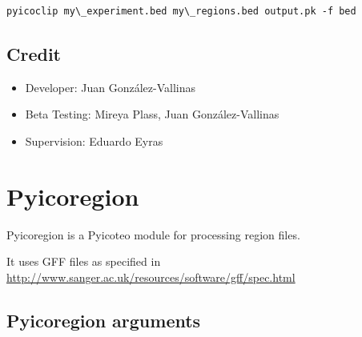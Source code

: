 \documentclass[letterpaper,10pt,english]{sphinxmanual}
\begin{document}
\begin{Verbatim}[commandchars=\\\{\}]
pyicoclip my\_experiment.bed my\_regions.bed output.pk -f bed
\end{Verbatim}


\subsection{Credit}
\label{pyicoclip:credit}\begin{itemize}
\item {} 
Developer: Juan González-Vallinas

\item {} 
Beta Testing: Mireya Plass, Juan González-Vallinas

\item {} 
Supervision: Eduardo Eyras

\end{itemize}


\section{Pyicoregion}
\label{pyicoregion::doc}\label{pyicoregion:pyicoregiondocs}\label{pyicoregion:pyicoregion}
Pyicoregion is a Pyicoteo module for processing region files.

It uses GFF files as specified in \href{http://www.sanger.ac.uk/resources/software/gff/spec.html}{http://www.sanger.ac.uk/resources/software/gff/spec.html}


\subsection{Pyicoregion arguments}
\label{pyicoregion:pyicoregion-arguments}
\end{document}
